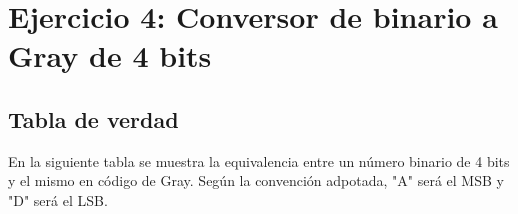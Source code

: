 \newenvironment{Karnaughquatre}%
{
\begin{tikzpicture}[baseline=(current bounding box.north),scale=0.8]
\draw (0,0) grid (2,2);
\draw (0,2) -- node [pos=0.7,above right,anchor=south west] {b} node [pos=0.7,below left,anchor=north east] {a} ++(135:1);
%
\matrix (mapa) [matrix of nodes,
        column sep={0.8cm,between origins},
        row sep={0.8cm,between origins},
        every node/.style={minimum size=0.3mm},
        anchor=2.center,
        ampersand replacement=\&] at (0.5,0.5)
{
          \& |(c00)| 0          \& |(c01)| 1  \\
|(r00)| 0 \& |(0)|  \phantom{0} \& |(1)|  \phantom{0} \\
|(r01)| 1 \& |(2)|  \phantom{0} \& |(3)|  \phantom{0} \\
};
}%
{
\end{tikzpicture}
}

\newcommand{\contingut}[1]{%
\foreach \x [count=\xi from 0]  in {#1}
     \path (\xi) node {\x};
}

\newcommand{\minterms}[1]{%
    \foreach \x in {#1}
        \path (\x) node {1};
}

\newcommand{\maxterms}[1]{%
    \foreach \x in {#1}
        \path (\x) node {0};
}

\newcommand{\indeterminats}[1]{%
    \foreach \x in {#1}
        \path (\x) node {X};
}



\section{Ejercicio 4: Conversor de binario a Gray de 4 bits}

\subsection{Tabla de verdad}
En la siguiente tabla se muestra la equivalencia entre un n\'umero binario de 4 bits y el mismo en c\'odigo de Gray. Seg\'un la convenci\'on adpotada, "A" ser\'a el MSB y "D" ser\'a el LSB.


